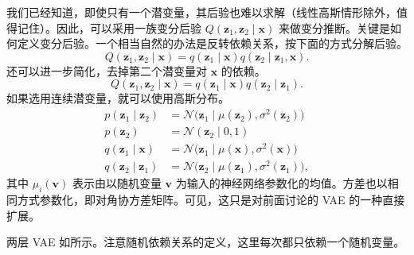 我们已经知道，即使只有一个潜变量，其后验也难以求解（线性高斯情形除外，值得记住）。因此，可以采用一族变分后验 $Q(\mathbf{z}_1,\mathbf{z}_2\mid\mathbf{x})$ 来做变分推断。关键是如何定义变分后验。一个相当自然的办法是反转依赖关系，按下面的方式分解后验。
\begin{equation}
Q(\mathbf{z}_1,\mathbf{z}_2\mid\mathbf{x})=q(\mathbf{z}_1\mid\mathbf{x})q(\mathbf{z}_2\mid\mathbf{z}_1,\mathbf{x}).
\tag{5.76}\label{eq:05-76}
\end{equation}
还可以进一步简化，去掉第二个潜变量对 $\mathbf{x}$ 的依赖。
\begin{equation}
Q(\mathbf{z}_1,\mathbf{z}_2\mid\mathbf{x})=q(\mathbf{z}_1\mid\mathbf{x})q(\mathbf{z}_2\mid\mathbf{z}_1).
\tag{5.77}\label{eq:05-77}
\end{equation}
如果选用连续潜变量，就可以使用高斯分布。
\begin{align}
p(\mathbf{z}_1\mid\mathbf{z}_2)&=\mathcal{N}\bigl(\mathbf{z}_1\mid\mu(\mathbf{z}_2),\sigma^2(\mathbf{z}_2)\bigr) \tag{5.78}\label{eq:05-78}\\
p(\mathbf{z}_2)&=\mathcal{N}(\mathbf{z}_2\mid 0,1) \tag{5.79}\label{eq:05-79}\\
q(\mathbf{z}_1\mid\mathbf{x})&=\mathcal{N}\bigl(\mathbf{z}_1\mid\mu(\mathbf{x}),\sigma^2(\mathbf{x})\bigr) \tag{5.80}\label{eq:05-80}\\
q(\mathbf{z}_2\mid\mathbf{z}_1)&=\mathcal{N}\bigl(\mathbf{z}_2\mid\mu(\mathbf{z}_1),\sigma^2(\mathbf{z}_1)\bigr), \tag{5.81}\label{eq:05-81}
\end{align}
其中 $\mu_i(\mathbf{v})$ 表示由以随机变量 $\mathbf{v}$ 为输入的神经网络参数化的均值。方差也以相同方式参数化，即对角协方差矩阵。可见，这只是对前面讨论的 VAE 的一种直接扩展。

两层 VAE 如所示。注意随机依赖关系的定义，这里每次都只依赖一个随机变量。

